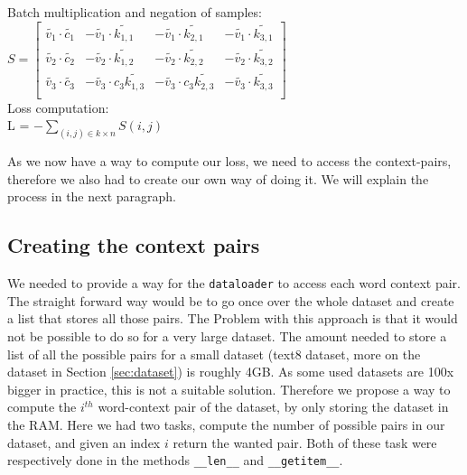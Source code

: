 Batch multiplication and negation of samples:\\
$S = \begin{bmatrix}
\tilde{v_1} \cdot  \tilde{c_1} & -\tilde{v_1} \cdot \tilde{k_{1,1}} & -\tilde{v_1} \cdot  \tilde{k_{2,1}}& -\tilde{v_1} \cdot  \tilde{k_{3,1}}\\
\tilde{v_2} \cdot \tilde{c_2} & -\tilde{v_2} \cdot \tilde{k_{1,2}} & -\tilde{v_2} \cdot \tilde{k_{2,2}} & -\tilde{v_2} \cdot \tilde{k_{3,2}}\\
\tilde{v_3} \cdot \tilde{c_3} &-\tilde{v_3} \cdot c_3  \tilde{k_{1,3}} & -\tilde{v_3} \cdot c_3 \tilde{k_{2,3}}&-\tilde{v_3} \cdot \tilde{k_{3,3}}\\
\end{bmatrix}$\\

Loss computation: \\
 L = $- \sum_{(i,j) \in k \times n} S(i,j) $
 
As we now have a way to compute our loss, we need to access the context-pairs, therefore we also had to create our own way of doing it. We will explain the process in the next paragraph.

\subsection{Creating the context pairs}
We needed to provide a way for the \texttt{dataloader} to access each word context pair. The straight forward way would be to go once over the whole dataset and create a list that stores all those pairs. The Problem with this approach is that it would not be possible to do so for a very large dataset. The amount needed to store a list of all the possible pairs for a small dataset (text8 dataset, more on the dataset in Section \ref{sec:dataset}) is roughly 4GB.  As some used datasets are 100x bigger in practice, this is not a suitable solution. Therefore we propose a way to compute the $i^{th}$ word-context pair of the dataset, by only storing the dataset in the RAM. Here we had two tasks, compute the number of possible pairs in our dataset, and given an index $i$ return the wanted pair. Both of these task were respectively done in the methods \texttt{\_\_len\_\_} and \texttt{\_\_getitem\_\_}.

